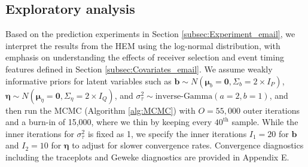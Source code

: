 \documentclass[ba]{imsart}
\numberwithin{equation}{section}
\theoremstyle{plain}
\begin{document}
	\subsection{Exploratory analysis}\label{subsec:Result_email}
	Based on the prediction experiments in Section \ref{subsec:Experiment_email}, we interpret the results from the HEM using the log-normal distribution, with emphasis on understanding the effects of receiver selection and event timing features defined in Section \ref{subsec:Covariates_email}. We assume weakly informative priors for latent variables such as $\boldsymbol{b}\sim N(\boldsymbol{\mu}_b=\boldsymbol{0}, \Sigma_b = 2\times I_P)$, $\boldsymbol{\eta}\sim N(\boldsymbol{\mu}_\eta=\boldsymbol{0}, \Sigma_\eta = 2\times I_Q)$, and $\sigma_\tau^2 \sim \mbox{inverse-Gamma}(a=2, b=1)$, and then run the MCMC (Algorithm \ref{alg:MCMC}) with $O=55,000$ outer iterations and a burn-in of 15,000, where we thin by keeping every $40^{\textrm{th}}$ sample. While the inner iterations for $\sigma_\tau^2$ is fixed as 1, we specify the inner iterations $I_1=20$ for $\boldsymbol{b}$ and $I_2=10$ for $\boldsymbol{\eta}$ to adjust for slower convergence rates. Convergence diagnostics including the traceplots and Geweke diagnostics \citep{geweke1991evaluating} are provided in Appendix E.
	
\end{document}
